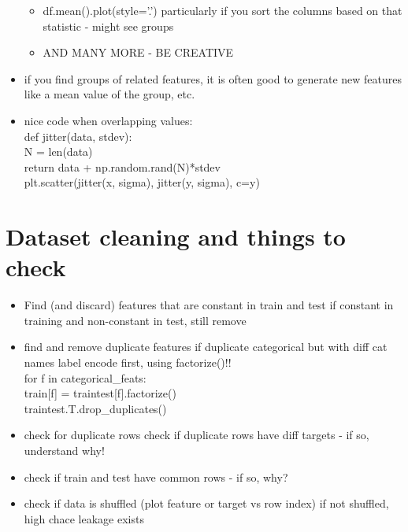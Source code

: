 \documentclass[a4paper]{report}
\begin{document}
\begin{itemize}
\begin{itemize}
      \item {\color{brown} df.mean().plot(style='.') }
	\subitem particularly if you sort the columns based on that statistic - might see groups
      \item AND MANY MORE - BE CREATIVE
    \end{itemize}
  \item if you find groups of related features, it is often good to generate new features like a mean value of the group, etc.
  \item nice code when overlapping values:\\
    def jitter(data, stdev):\\
    \hspace*{1cm} N  = len(data)\\
    \hspace*{1cm} return data + np.random.rand(N)*stdev\\
plt.scatter(jitter(x, sigma), jitter(y, sigma), c=y)
\end{itemize}

\section{Dataset cleaning and things to check}
\begin{itemize}
  \item Find (and discard) features that are constant in train and test
    \subitem if constant in training and non-constant in test, still remove
  \item find and remove duplicate features
    \subitem if duplicate categorical but with diff cat names label encode first, using factorize()!!\\
  for f in categorical\_feats:\\
  \hspace*{1cm} train[f] = traintest[f].factorize()\\
  traintest.T.drop\_duplicates()
  \item check for duplicate rows
    \subitem check if duplicate rows have diff targets - if so, understand why!
  \item check if train and test have common rows - if so, why?
  \item check if data is shuffled (plot feature or target vs row index)
    \subitem if not shuffled, high chace leakage exists
\end{itemize}
\end{document}
